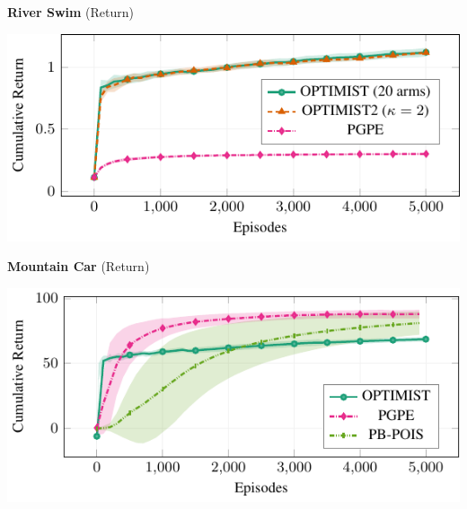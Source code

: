 \documentclass[landscape,a0paper,fontscale=0.35]{baposter}
\begin{document}
\begin{poster}
{\begin{center}
		\textbf{River Swim} (Return)
		
		\begin{minipage}{.85\textwidth}
			\includegraphics[width=\textwidth]{plots/riverswim/plot_main.pdf}
		\end{minipage}
		
		\textbf{Mountain Car} (Return)
		
		\begin{minipage}{.85\textwidth}
			\includegraphics[width=\textwidth]{plots/mc/plot.pdf}
		\end{minipage}
	\end{center}

}




\end{poster}
\end{document}
